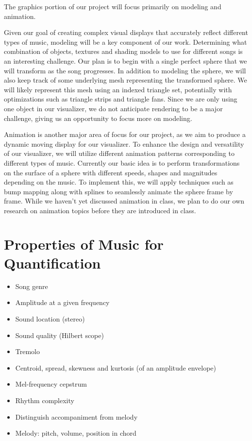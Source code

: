 \documentclass{article}
\begin{document}
The graphics portion of our project will focus primarily on modeling and animation.
 
Given our goal of creating complex visual displays that accurately reflect different types of music, modeling will be a key component of our work. Determining what combination of objects, textures and shading models to use for different songs is an interesting challenge. Our plan is to begin with a single perfect sphere that we will transform as the song progresses. In addition to modeling the sphere, we will also keep track of some underlying mesh representing the transformed sphere. We will likely represent this mesh using an indexed triangle set, potentially with optimizations such as triangle strips and triangle fans. Since we are only using one object in our visualizer, we do not anticipate rendering to be a major challenge, giving us an opportunity to focus more on modeling. 
 
Animation is another major area of focus for our project, as we aim to produce a dynamic moving display for our visualizer. To enhance the design and versatility of our visualizer, we will utilize different animation patterns corresponding to different types of music. Currently our basic idea is to perform transformations on the surface of a sphere with different speeds, shapes and magnitudes depending on the music. To implement this, we will apply techniques such as bump mapping along with splines to seamlessly animate the sphere frame by frame. While we haven’t yet discussed animation in class, we plan to do our own research on animation topics before they are introduced in class.

\section{Properties of Music for Quantification}

\begin{itemize}
	\item Song genre
	\item Amplitude at a given frequency
	\item Sound location (stereo)
	\item Sound quality (Hilbert scope)
	\item Tremolo
	\item Centroid, spread, skewness and kurtosis (of an amplitude envelope)
	\item Mel-frequency cepstrum
	\item Rhythm complexity
	\item Distinguish accompaniment from melody
	\item Melody: pitch, volume, position in chord
\end{itemize}
\end{document}

